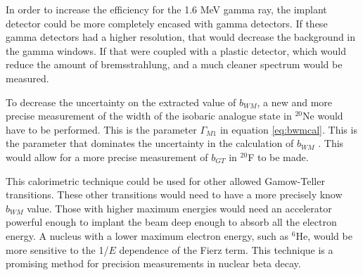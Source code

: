 \documentclass[../MaxHughesThesis.tex]{subfiles}
\begin{document}
In order to increase the efficiency for the 1.6 MeV gamma ray, the implant detector could be more completely encased with gamma detectors.
If these gamma detectors had a higher resolution, that would decrease the background in the gamma windows. 
If that were coupled with a plastic detector, which would reduce the amount of bremsstrahlung, and a much cleaner spectrum would be measured.

To decrease the uncertainty on the extracted value of $b_{WM}$, a new and more precise measurement of the width of the isobaric analogue state in $^{20}$Ne would have to be performed.
This is the parameter $\Gamma_{M1}$ in equation \ref{eq:bwmcal}.
This is the parameter that dominates the uncertainty in  the calculation of $b_{WM}$ \cite{Min11}.
This would allow for a more precise measurement of $b_{GT}$ in $^{20}$F to be made.

This calorimetric technique could be used for other allowed Gamow-Teller transitions.
These other transitions would need to have a more precisely know $b_{WM}$ value.
Those with higher maximum energies would need an accelerator powerful enough to implant the beam deep enough to absorb all the electron energy.
A nucleus with a lower maximum electron energy, such as $^{6}$He, would be more sensitive to the 1/$E$ dependence of the Fierz term. 
This technique is a promising method for precision measurements in nuclear beta decay.
\end{document}

